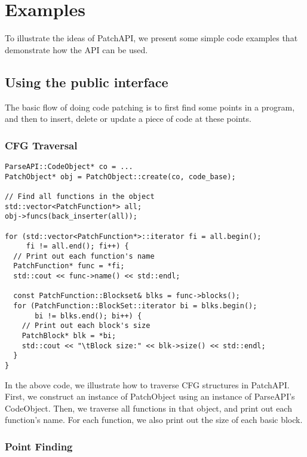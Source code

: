 \section{Examples} \label{sec-example}
To illustrate the ideas of PatchAPI, we present some simple code examples that
demonstrate how the API can be used.

\subsection{Using the public interface}
The basic flow of doing code patching is to first find some points in a program,
and then to insert, delete or update a piece of code at these points.
\subsubsection{CFG Traversal}
\lstset{numbers=left}
\begin{lstlisting}
ParseAPI::CodeObject* co = ...
PatchObject* obj = PatchObject::create(co, code_base);

// Find all functions in the object
std::vector<PatchFunction*> all;
obj->funcs(back_inserter(all));

for (std::vector<PatchFunction*>::iterator fi = all.begin();
     fi != all.end(); fi++) {
  // Print out each function's name
  PatchFunction* func = *fi;
  std::cout << func->name() << std::endl;

  const PatchFunction::Blockset& blks = func->blocks();
  for (PatchFunction::BlockSet::iterator bi = blks.begin();
       bi != blks.end(); bi++) {
    // Print out each block's size
    PatchBlock* blk = *bi;
    std::cout << "\tBlock size:" << blk->size() << std::endl;
  }
}
\end{lstlisting}
In the above code, we illustrate how to traverse CFG structures in
PatchAPI. First, we construct an instance of PatchObject using an instance of
ParseAPI's CodeObject. Then, we traverse all functions in that object, and print
out each function's name. For each function, we also print out the size of each
basic block.

\subsubsection{Point Finding} \label{sec-example-pt}

